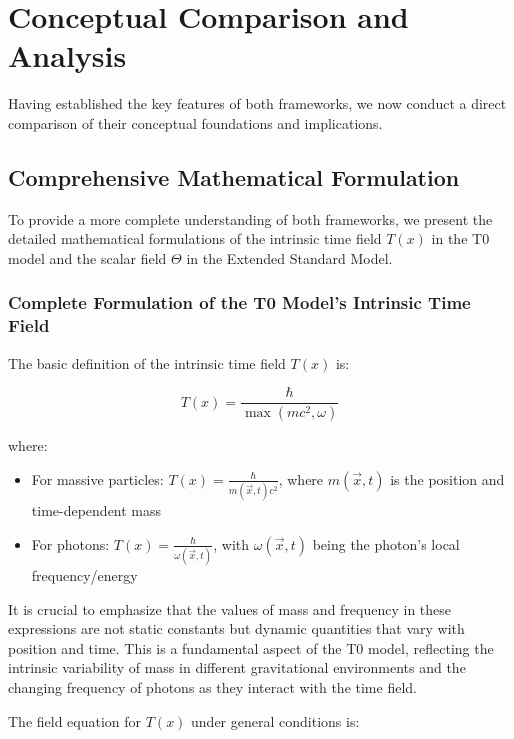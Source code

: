 \documentclass[12pt,a4paper]{article}
\newcommand{\Tfield}{T(x)}
\newcommand{\vecx}{\vec{x}}
\begin{document}
	\section{Conceptual Comparison and Analysis}
	\label{sec:conceptual_comparison}
	
	Having established the key features of both frameworks, we now conduct a direct comparison of their conceptual foundations and implications.
	
	\subsection{Comprehensive Mathematical Formulation}
	\label{subsec:comprehensive_math}
	
	To provide a more complete understanding of both frameworks, we present the detailed mathematical formulations of the intrinsic time field \(\Tfield\) in the T0 model and the scalar field \(\Theta\) in the Extended Standard Model.
	
	\subsubsection{Complete Formulation of the T0 Model's Intrinsic Time Field}
	\label{subsubsec:t0_complete}
	
	The basic definition of the intrinsic time field \(\Tfield\) is:
	
	\begin{equation}
		\Tfield = \frac{\hbar}{\max(mc^2, \omega)}
	\end{equation}
	
	where:
	\begin{itemize}
		\item For massive particles: \(\Tfield = \frac{\hbar}{m(\vecx,t)c^2}\), where \(m(\vecx,t)\) is the position and time-dependent mass
		\item For photons: \(\Tfield = \frac{\hbar}{\omega(\vecx,t)}\), with \(\omega(\vecx,t)\) being the photon's local frequency/energy
	\end{itemize}
	
	It is crucial to emphasize that the values of mass and frequency in these expressions are not static constants but dynamic quantities that vary with position and time. This is a fundamental aspect of the T0 model, reflecting the intrinsic variability of mass in different gravitational environments and the changing frequency of photons as they interact with the time field.
	
	The field equation for \(\Tfield\) under general conditions is:
	
\end{document}

